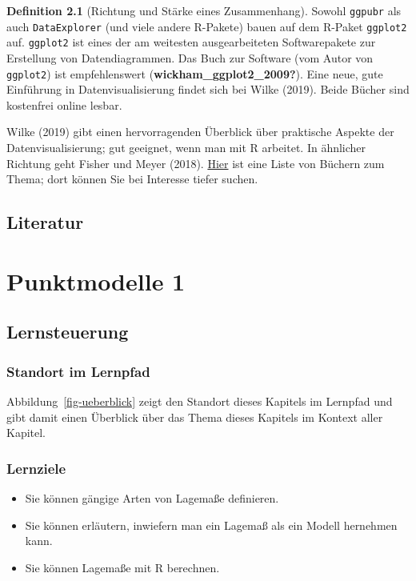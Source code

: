 \documentclass[
  a4paper,
  DIV=11]{scrreprt}
\providecommand{\tightlist}{%
  \setlength{\itemsep}{0pt}\setlength{\parskip}{0pt}}\usepackage{longtable,booktabs,array}
\theoremstyle{definition}
\theoremstyle{definition}
\theoremstyle{definition}
\newtheorem{definition}{Definition}[chapter]
\theoremstyle{remark}
\begin{document}
\begin{definition}[Richtung und Stärke eines
Zusammenhang]
Sowohl \texttt{ggpubr} als auch \texttt{DataExplorer} (und viele andere
R-Pakete) bauen auf dem R-Paket \texttt{ggplot2} auf. \texttt{ggplot2}
ist eines der am weitesten ausgearbeiteten Softwarepakete zur Erstellung
von Datendiagrammen. Das Buch zur Software (vom Autor von
\texttt{ggplot2}) ist empfehlenswert (\textbf{wickham\_ggplot2\_2009?}).
Eine neue, gute Einführung in Datenvisualisierung findet sich bei Wilke
(2019). Beide Bücher sind kostenfrei online lesbar.

Wilke (2019) gibt einen hervorragenden Überblick über praktische Aspekte
der Datenvisualisierung; gut geeignet, wenn man mit R arbeitet. In
ähnlicher Richtung geht Fisher und Meyer (2018).
\href{https://www.bing.com/search?pc=OA1&q=introductory\%20books\%20on\%20data\%20visualization\%20with\%20DOI}{Hier}
ist eine Liste von Büchern zum Thema; dort können Sie bei Interesse
tiefer suchen.

\section{Literatur}\label{literatur-3}

\chapter{Punktmodelle 1}\label{sec-punktmodelle1}

\section{Lernsteuerung}\label{lernsteuerung-4}

\subsection{Standort im Lernpfad}\label{standort-im-lernpfad-4}

Abbildung~\ref{fig-ueberblick} zeigt den Standort dieses Kapitels im
Lernpfad und gibt damit einen Überblick über das Thema dieses Kapitels
im Kontext aller Kapitel.

\subsection{Lernziele}\label{lernziele-5}

\begin{itemize}
\tightlist
\item
  Sie können gängige Arten von Lagemaße definieren.
\item
  Sie können erläutern, inwiefern man ein Lagemaß als ein Modell
  hernehmen kann.
\item
  Sie können Lagemaße mit R berechnen.
\end{itemize}


\end{definition}
\end{document}
